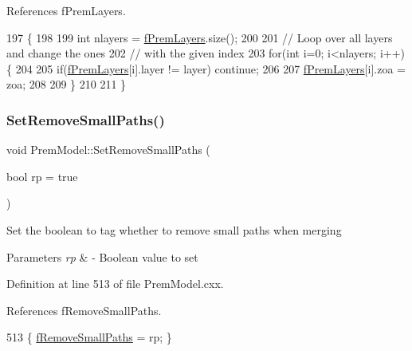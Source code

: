 References f\+Prem\+Layers.


\begin{DoxyCode}
197 \{
198 
199   \textcolor{keywordtype}{int} nlayers = \hyperlink{classOscProb_1_1PremModel_a19a9a3b23ec154ad7a29f92b74aa5bc6}{fPremLayers}.size();
200   
201   \textcolor{comment}{// Loop over all layers and change the ones}
202   \textcolor{comment}{// with the given index}
203   \textcolor{keywordflow}{for}(\textcolor{keywordtype}{int} i=0; i<nlayers; i++)\{
204   
205     \textcolor{keywordflow}{if}(\hyperlink{classOscProb_1_1PremModel_a19a9a3b23ec154ad7a29f92b74aa5bc6}{fPremLayers}[i].layer != layer) \textcolor{keywordflow}{continue};
206     
207     \hyperlink{classOscProb_1_1PremModel_a19a9a3b23ec154ad7a29f92b74aa5bc6}{fPremLayers}[i].zoa = zoa;
208   
209   \}
210 
211 \}
\end{DoxyCode}
\mbox{\label{classOscProb_1_1PremModel_ac5496d6d5bafcf7740c60838d3eee7b3}} 
\subsubsection{\texorpdfstring{Set\+Remove\+Small\+Paths()}{SetRemoveSmallPaths()}}
{\footnotesize\ttfamily void Prem\+Model\+::\+Set\+Remove\+Small\+Paths (\begin{DoxyParamCaption}\item[{bool}]{rp = {\ttfamily true} }\end{DoxyParamCaption})\hspace{0.3cm}{\ttfamily [virtual]}}

Set the boolean to tag whether to remove small paths when merging


\begin{DoxyParams}{Parameters}
{\em rp} & -\/ Boolean value to set \\
\hline
\end{DoxyParams}


Definition at line 513 of file Prem\+Model.\+cxx.



References f\+Remove\+Small\+Paths.


\begin{DoxyCode}
513 \{ \hyperlink{classOscProb_1_1PremModel_a3973df6f5f2ff219cd2f865b31aacfd2}{fRemoveSmallPaths} = rp; \}
\end{DoxyCode}



